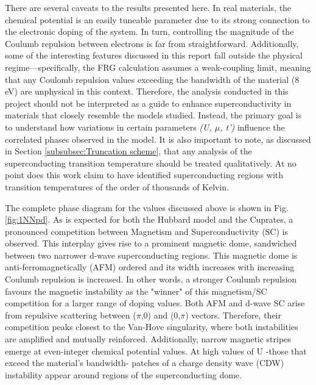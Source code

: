 \documentclass[12pt]{article}
\begin{document}
\noindent There are several caveats to the results presented here. In real materials,  the chemical potential is an easily tuneable parameter due to its strong connection to the electronic doping of the system.
In turn, controlling the magnitude of the Coulumb repulsion between electrons is far from straightforward. 
Additionally, some of the interesting features discussed in this report fall outside the physical regime—specifically, the FRG calculation assumes a weak-coupling limit, meaning that any Coulomb 
repulsion values exceeding the bandwidth of the material (8 eV) are unphysical in this context.
Therefore, the analysis conducted in this project should not be interpreted as a guide to enhance superconductivity in materials that closely resemble the models studied.
Instead, the primary goal is to understand how variations in certain parameters \textit{(U, $\mu$, t')} influence the correlated phases observed in the model. 
It is also important to note, as discussed in Section \ref{subsubsec:Truncation scheme}, that any analysis of the 
superconducting transition temperature should be treated qualitatively. At no point does this work claim to have identified superconducting 
regions with transition temperatures of the order of thousands of Kelvin.


\medskip
\noindent The complete phase diagram for the values discussed above is shown in Fig.\ref{fig:1NNpd}. As is expected
for both the Hubbard model and the Cuprates\cite{kivelson1998electronic,fradkin2015colloquium,vanhala2018dynamical}, a pronounced competition between Magnetism and 
Superconductivity (SC) is observed. This interplay gives rise to a prominent magnetic dome, sandwiched between two narrower d-wave superconducting regions. This magnetic dome is 
anti-ferromagnetically (AFM) ordered and its width increases with increasing Coulumb repulsion is increased. In other words, a stronger Coulumb repulsion favours the magnetic instability as the "winner" of this magnetism/SC competition 
for a larger range of doping values. Both AFM and d-wave SC arise from repulsive scattering between
($\pi$,0) and (0,$\pi$) vectors. Therefore, their competition peaks closest to the Van-Hove singularity, where both instabilities are amplified and mutually reinforced\cite{furukawa1998truncation,honerkamp2001temperature}.
Additionally, narrow magnetic stripes emerge at even-integer chemical potential values. At high values of U -those that exceed the material's bandwidth- patches of a charge density wave (CDW) instability appear around regions of the superconducting dome.\par
\end{document}
